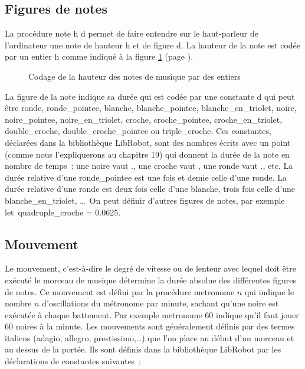 \subsection{Figures de notes}

La procédure {\idt note h d} permet
de faire entendre sur le haut-parleur de l'ordinateur une note de hauteur {\idt h} et de
figure {\idt d}. La hauteur de la note est codée par un entier {\idt h} comme indiqué à la figure
\ref{fig:codenotes} (page \pageref{fig:codenotes}).
\begin{figure}[htbp]
 
 \caption{Codage de la hauteur des notes de musique par des entiers}\label{fig:codenotes}
\end{figure}
La figure de la note indique sa durée qui est codée par une constante {\idt d} qui peut être {\idt ronde},
{\idt ronde\_pointee},
{\idt blanche},
{\idt blanche\_pointee},
{\idt blanche\_en\_triolet},
{\idt noire},
{\idt noi\-re\_poin\-tee},
{\idt noi\-re\_\-en\_\-tri\-o\-let},
 {\idt croche},
 {\idt croche\_pointee},
{\idt cro\-che\_\-en\_\-trio\-let},
{\idt double\_croche},
{\idt dou\-ble\_\-cro\-che\_\-poin\-tee} ou
{\idt tri\-ple\_\-cro\-che}. Ces constantes, déclarées dans la bibliothèque {\idt LibRobot},
sont des nombres écrits avec un point (comme nous l'expliquerons au chapitre 19) qui
donnent la durée de la note en nombre de temps~: une {\idt noire} vaut {.},
une {\idt croche} vaut {}, une {\idt ronde} vaut {.}, etc.
La durée relative d'une {\idt ron\-de\_\-poin\-tee} est
une fois et demie celle d'une
 {\idt ronde}. La durée relative d'une {\idt ronde} est  deux fois celle d'une
 {\idt blanche}, trois fois celle d'une {\idt blan\-che\_\-en\_\-trio\-let}, \ldots\
On peut définir d'autres figures de notes, par exemple
{\mcl let}\ {\idt quadruple\_croche = 0.0625}.

 \subsection{Mouvement}

 Le mouvement,
 c'est-à-dire le degré de vitesse ou de lenteur avec lequel doit être exécuté le morceau de
 musique détermine la durée absolue des différentes figures de notes. Ce mouvement est défini
 par la procédure {\idt metronome $n$} qui indique le nombre $n$ d'oscillations du
 métronome par minute, sachant qu'une noire est exécutée à chaque battement.  Par exemple
 {\idt metronome 60} indique qu'il faut jouer 60 noires à la minute. Les mouvements
 sont gé\-né\-ra\-le\-ment définis par des termes italiens (adagio, allegro, prestissimo,\ldots) que
 l'on place au début d'un morceau et au dessus de la portée. Ils sont définis
 dans la bibliothèque {\idt LibRobot} par les déclarations de constantes suivantes~:

